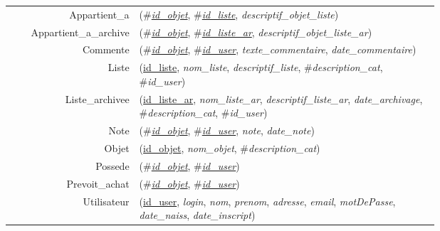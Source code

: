 
\usepackage[normalem]{ulem}
\newenvironment{mld}
  {\par\begin{minipage}{\linewidth}\begin{tabular}{rp{0.7\linewidth}}}
  {\end{tabular}\end{minipage}\par}
\newcommand{\relat}[1]{\textsc{#1}}
\newcommand{\attr}[1]{\emph{#1}}
\newcommand{\prim}[1]{\uline{#1}}
\newcommand{\foreign}[1]{\#\textsl{#1}}


\begin{mld}
  Appartient\_a & (\foreign{\prim{id\_objet}}, \foreign{\prim{id\_liste}}, \attr{descriptif\_objet\_liste})\\
  Appartient\_a\_archive & (\foreign{\prim{id\_objet}}, \foreign{\prim{id\_liste\_ar}}, \attr{descriptif\_objet\_liste\_ar})\\
  Commente & (\foreign{\prim{id\_objet}}, \foreign{\prim{id\_user}}, \attr{texte\_commentaire}, \attr{date\_commentaire})\\
  Liste & (\prim{id\_liste}, \attr{nom\_liste}, \attr{descriptif\_liste}, \foreign{description\_cat}, \foreign{id\_user})\\
  Liste\_archivee & (\prim{id\_liste\_ar}, \attr{nom\_liste\_ar}, \attr{descriptif\_liste\_ar}, \attr{date\_archivage}, \foreign{description\_cat}, \foreign{id\_user})\\
  Note & (\foreign{\prim{id\_objet}}, \foreign{\prim{id\_user}}, \attr{note}, \attr{date\_note})\\
  Objet & (\prim{id\_objet}, \attr{nom\_objet}, \foreign{description\_cat})\\
  Possede & (\foreign{\prim{id\_objet}}, \foreign{\prim{id\_user}})\\
  Prevoit\_achat & (\foreign{\prim{id\_objet}}, \foreign{\prim{id\_user}})\\
  Utilisateur & (\prim{id\_user}, \attr{login}, \attr{nom}, \attr{prenom}, \attr{adresse}, \attr{email}, \attr{motDePasse}, \attr{date\_naiss}, \attr{date\_inscript})\\
\end{mld}